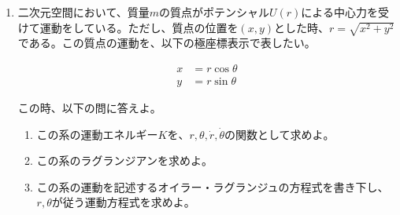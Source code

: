 \documentclass{jsarticle}
\begin{document}
\begin{enumerate}
    \item 二次元空間において、質量$m$の質点がポテンシャル$U(r)$による中心力を受けて運動をしている。ただし、質点の位置を$(x,y)$とした時、$r=\sqrt{x^2+y^2}$である。この質点の運動を、以下の極座標表示で表したい。

          $$
              \begin{aligned}
                  x & = r\cos \theta \\
                  y & = r\sin \theta
              \end{aligned}
          $$

          この時、以下の問に答えよ。
          \begin{enumerate}
              \item この系の運動エネルギー$K$を、$r, \theta, \dot{r}, \dot{\theta}$の関数として求めよ。
              \item この系のラグランジアンを求めよ。
              \item この系の運動を記述するオイラー・ラグランジュの方程式を書き下し、$r, \theta$が従う運動方程式を求めよ。
          \end{enumerate}

\end{enumerate}
\end{document}
